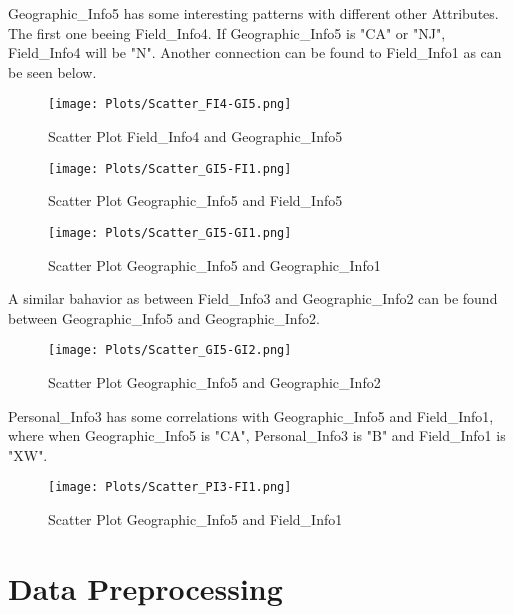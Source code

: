 Geographic\_Info5 has some interesting patterns with different other Attributes. The first one beeing Field\_Info4. If Geographic\_Info5 is "CA" or "NJ", Field\_Info4 will be "N". Another connection can be found to Field\_Info1 as can be seen below. 
\begin{figure}[H]
	\begin{center}
		\texttt{[image: Plots/Scatter\_FI4-GI5.png]}
	\end{center}
	\caption{Scatter Plot Field\_Info4 and Geographic\_Info5}
\end{figure}
\begin{figure}[H]
	\begin{center}
		\texttt{[image: Plots/Scatter\_GI5-FI1.png]}
	\end{center}
	\caption{Scatter Plot Geographic\_Info5 and Field\_Info5}
\end{figure}
\begin{figure}[H]
	\begin{center}
		\texttt{[image: Plots/Scatter\_GI5-GI1.png]}
	\end{center}
	\caption{Scatter Plot Geographic\_Info5 and Geographic\_Info1}
\end{figure}

A similar bahavior as between Field\_Info3 and Geographic\_Info2 can be found between Geographic\_Info5 and Geographic\_Info2.

\begin{figure}[H]
	\begin{center}
		\texttt{[image: Plots/Scatter\_GI5-GI2.png]}
	\end{center}
	\caption{Scatter Plot Geographic\_Info5 and Geographic\_Info2}
\end{figure}

Personal\_Info3 has some correlations with Geographic\_Info5 and Field\_Info1, where when Geographic\_Info5 is "CA", Personal\_Info3 is "B" and Field\_Info1 is "XW".

\begin{figure}[H]
	\begin{center}
		\texttt{[image: Plots/Scatter\_PI3-FI1.png]}
	\end{center}
	\caption{Scatter Plot Geographic\_Info5 and Field\_Info1}
\end{figure}


\section{Data Preprocessing}
